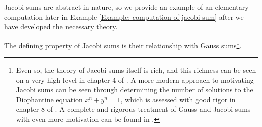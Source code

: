 \documentclass[10pt]{amsart}
\theoremstyle{plain}
\theoremstyle{definition}
\theoremstyle{remark}
\numberwithin{equation}{section}
\begin{document}
Jacobi sums are abstract in nature, so we provide an example of an elementary computation later in Example \ref{Example: computation of jacobi sum} after we have developed the necessary theory.

The defining property of Jacobi sums is their relationship with Gauss sums\footnote{Even so, the theory of Jacobi sums itself is rich, and this richness can be seen on a very high level in chapter 4 of \cite{lemmermeyer2000reciprocity}. A more modern approach to motivating Jacobi sums can be seen through determining the number of solutions to the Diophantine equation $x^{n}+y^{n}=1$, which is assessed with good rigor in chapter 8 of \cite{ireland1990classical}. A complete and rigorous treatment of Gauss and Jacobi sums with even more motivation can be found in \cite{berndt1998gauss}.}.
\end{document}
